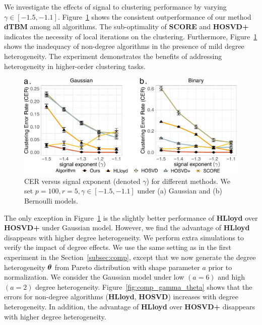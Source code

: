 \documentclass[lettersize,journal]{IEEEtran}
\theoremstyle{definition}
\theoremstyle{definition}
\begin{document}
We investigate the effects of signal to clustering performance by varying $\gamma \in [-1.5, -1.1]$. Figure~\ref{fig:comp_gamma} shows the consistent outperformance of our method \textbf{\small dTBM} among all algorithms. The sub-optimality of \textbf{\small SCORE} and \textbf{\small HOSVD+} indicates the necessity of local iterations on the clustering. Furthermore,  Figure~\ref{fig:comp_gamma} shows the inadequacy of non-degree algorithms in the presence of mild degree heterogeneity. 
The experiment demonstrates the benefits of addressing heterogeneity in higher-order clustering tasks.   


\begin{figure}[h!]
    \centering
    \includegraphics[width=\columnwidth]{comp_gamma_anno3.pdf}
    \caption{CER versus signal exponent (denoted $\gamma$) for different methods. We set $p = 100, r = 5, \gamma \in [-1.5, -1.1]$ under (a) Gaussian and (b) Bernoulli models.}
    \label{fig:comp_gamma}
\end{figure}


The only exception in Figure~\ref{fig:comp_gamma} is the slightly better performance of \textbf{\small HLloyd} over \textbf{\small HOSVD+} under Gaussian model. However, we find the advantage of \textbf{\small HLloyd} disappears with higher degree heterogeneity. We perform extra simulations to verify the impact of degree effects. We use the same setting as in the first experiment in the Section~\ref{subsec:comp}, except that we now generate the degree heterogeneity $\boldsymbol{\theta}$ from Pareto distribution with shape parameter $a$ prior to normalization. We consider the Gaussian model under low $(a = 6)$ and high $(a = 2)$ degree heterogeneity. Figure~\ref{fig:comp_gamma_theta} shows that the errors for non-degree algorithms (\textbf{\small HLloyd}, \textbf{\small HOSVD}) increases with degree heterogeneity. In addition, the advantage of \textbf{\small HLloyd} over \textbf{\small HOSVD+} disappears with higher degree heterogeneity. 
\end{document}
